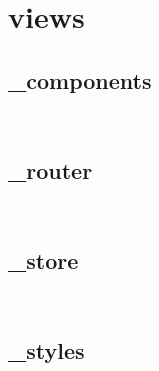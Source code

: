 \section{views}


\subsection{\_components}


\begin{lstlisting}[language=bash]

\end{lstlisting}



\begin{lstlisting}[language=bash]

\end{lstlisting}


\subsection{\_router}



\begin{lstlisting}[language=bash]

\end{lstlisting}



\begin{lstlisting}[language=bash]

\end{lstlisting}



\subsection{\_store}


\begin{lstlisting}[language=bash]

\end{lstlisting}



\begin{lstlisting}[language=bash]

\end{lstlisting}



\subsection{\_styles}



